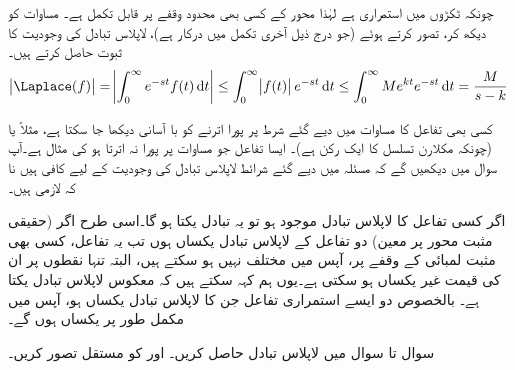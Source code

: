 چونکہ  ٹکڑوں میں استمراری ہے لہٰذا  محور کے کسی بھی محدود وقفے پر  قابل تکمل ہے۔ مساوات  کو دیکھ کر،  تصور کرتے ہوئے (جو درج ذیل آخری تکمل میں درکار ہے)، لاپلاس تبادل کی وجودیت کا ثبوت حاصل کرتے ہیں۔
\begin{align*}
\abs{\Laplace(f)} = \abs{\int_{0}^{\infty} e^{-st}f(t)\dif t}\le \int_{0}^{\infty} \abs{f(t)}e^{-st}\dif t\le \int_{0}^{\infty} Me^{kt}e^{-st}\dif t=\frac{M}{s-k}
\end{align*}

کسی بھی تفاعل کا مساوات  میں دیے گئے شرط پر پورا اترنے کو با آسانی دیکھا جا سکتا ہے، مثلاً  یا  (چونکہ  مکلارن تسلسل کا ایک رکن ہے)۔ ایسا تفاعل جو مساوات  پر پورا نہ اترتا ہو کی مثال  ہے۔آپ سوال  میں دیکھیں گے کہ مسئلہ  میں دیے گئے شرائط لاپلاس تبادل کی وجودیت کے لیے کافی ہیں نا کہ لازمی ہیں۔

اگر کسی تفاعل کا لاپلاس تبادل موجود ہو تو یہ تبادل یکتا ہو گا۔اسی طرح اگر (حقیقی مثبت محور پر معین) دو تفاعل کے لاپلاس تبادل یکساں ہوں تب یہ تفاعل، کسی بھی مثبت لمبائی کے وقفے پر،  آپس میں مختلف نہیں ہو سکتے ہیں، البتہ تنہا نقطوں پر ان کی قیمت غیر یکساں ہو سکتی ہے۔یوں ہم کہہ سکتے ہیں کہ معکوس لاپلاس تبادل یکتا ہے۔ بالخصوص دو ایسے استمراری تفاعل جن کا لاپلاس تبادل یکساں ہو، آپس میں مکمل طور پر یکساں ہوں گے۔ 

سوال  تا سوال  میں لاپلاس تبادل حاصل کریں۔  اور   کو مستقل تصور کریں۔


